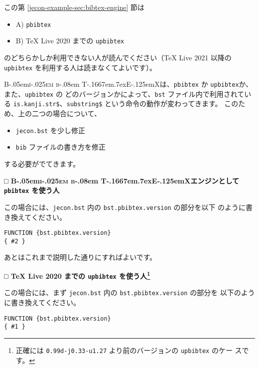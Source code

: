 \documentclass[article]{jlreq}
\newcommand{\BibTeX}{\textrm{B\kern-.05em\textsc{i\kern-.025em b}\kern-.08em%
T\kern-.1667em\lower.7ex\hbox{E}\kern-.125emX}}
\newcommand{\midashiii}[1]{\noindent \textbf{□ #1}}
\begin{document}
この第 \ref{jecon-example-sec:bibtex-engine} 節は
\begin{itemize}
 \item A) \texttt{pbibtex}
 \item B) TeX Live 2020 までの \texttt{upbibtex}
\end{itemize}
のどちらかしか利用できない人が読んでください（TeX Live 2021 以降の
\texttt{upbibtex} を利用する人は読まなくてよいです）。

\vspace*{1em}

\BibTeX は、\texttt{pbibtex} か \texttt{upbibtex}か、また、\texttt{upbibtex} の
どのバージョンかによって、\texttt{bst} ファイル内で利用されている
\texttt{is.kanji.str\$}、\texttt{substring\$} という命令の動作が変わってきます。
このため、上の二つの場合について、
\begin{itemize}
 \item \texttt{jecon.bst} を少し修正
 \item \texttt{bib} ファイルの書き方を修正
\end{itemize}
する必要がでてきます。

\vspace*{1em}

\midashiii{\BibTeX エンジンとして \texttt{pbibtex} を使う人}

この場合には、\texttt{jecon.bst} 内の \texttt{bst.pbibtex.version} の部分を以下
のように書き換えてください。
\begin{screen}
\begin{verbatim}
FUNCTION {bst.pbibtex.version}
{ #2 }
\end{verbatim}
\end{screen}

あとはこれまで説明した通りにすればよいです。

\vspace*{1em}

\midashiii{TeX Live 2020 までの \texttt{upbibtex} を使う人\footnote{正確には
       \texttt{0.99d-j0.33-u1.27} より前のバージョンの \texttt{upbibtex} のケー
       スです。}}

この場合には、まず \texttt{jecon.bst} 内の \texttt{bst.pbibtex.version} の部分を
以下のように書き換えてください。
\begin{screen}
\begin{verbatim}
FUNCTION {bst.pbibtex.version}
{ #1 }
\end{verbatim}
\end{screen}

\vspace*{1em}
\end{document}
